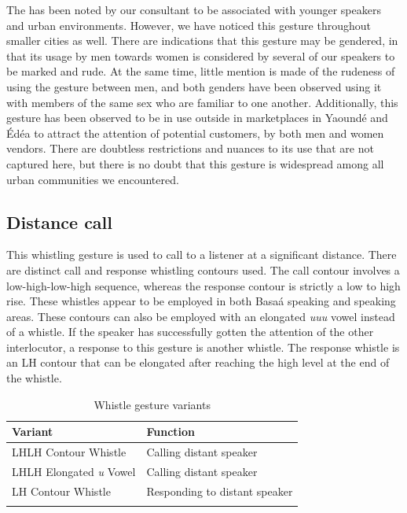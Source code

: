 \documentclass[output=paper,newtxmath,modfonts,nonflat,hidelinks]{langsci/langscibook}
\begin{document}
The  has been noted by our  consultant to be associated with younger speakers and urban environments. However, we have noticed this gesture throughout smaller cities as well. There are indications that this gesture may be gendered, in that its usage by men towards women is considered by several of our speakers to be marked and rude. At the same time, little mention is made of the rudeness of using the gesture between men, and both genders have been observed using it with members of the same sex who are familiar to one another. Additionally, this gesture has been observed to be in use outside in marketplaces in Yaound\'e and \'Ed\'ea to attract the attention of potential customers, by both men and women vendors. There are doubtless restrictions and nuances to its use that are not captured here, but there is no doubt that this gesture is widespread among all urban communities we encountered. 

\subsection{Distance call}
This whistling gesture is used to call to a listener at a significant distance. There are distinct call and response whistling contours used. The call contour involves a low-high-low-high sequence, whereas the response contour is strictly a low to high rise. These whistles appear to be employed in both Basa\'a speaking and  speaking areas. These contours can also be employed with an elongated \textit{uuu} vowel instead of a whistle. If the speaker has successfully gotten the attention of the other interlocutor, a response to this gesture is another whistle. The response whistle is an LH contour that can be elongated after reaching the high level  at the end of the whistle. 

\begin{table}
\caption{Whistle gesture variants}
\begin{tabularx}{\textwidth}{Xl} 
\lsptoprule
Variant & Function \\ \midrule
LHLH Contour Whistle & Calling distant speaker \\ 
LHLH Elongated \textit{u} Vowel & Calling distant speaker \\ 
LH Contour Whistle & Responding to distant speaker \\ \lspbottomrule
\end{tabularx}
\end{table}
\end{document}
